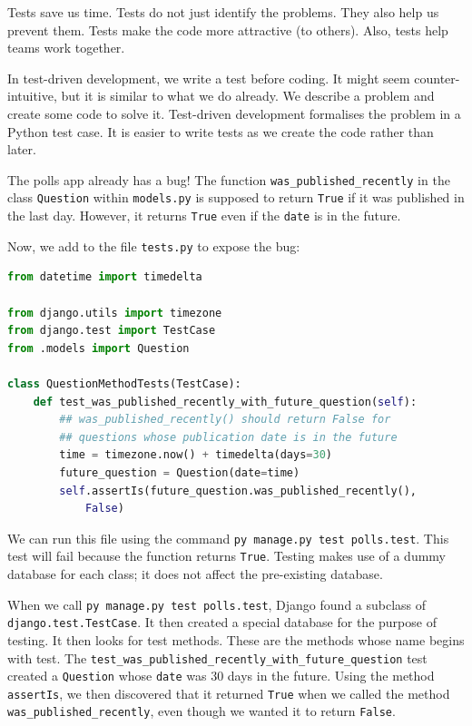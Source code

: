\documentclass[a4paper, openany]{memoir}
\begin{document}
    \noindent Tests save us time. Tests do not just identify the problems. They also help us prevent them. Tests make the code more attractive (to others). Also, tests help teams work together.

    \noindent In test-driven development, we write a test before coding. It might seem counter-intuitive, but it is similar to what we do already. We describe a problem and create some code to solve it. Test-driven development formalises the problem in a Python test case. It is easier to write tests as we create the code rather than later.

    \noindent The polls app already has a bug! The function \texttt{was\_published\_recently} in the class \texttt{Question} within \texttt{models.py} is supposed to return \texttt{True} if it was published in the last day. However, it returns \texttt{True} even if the \texttt{date} is in the future.

    \noindent Now, we add to the file \texttt{tests.py} to expose the bug:
\begin{lstlisting}[language=python]
from datetime import timedelta

from django.utils import timezone
from django.test import TestCase
from .models import Question

class QuestionMethodTests(TestCase):
    def test_was_published_recently_with_future_question(self):
        ## was_published_recently() should return False for
        ## questions whose publication date is in the future
        time = timezone.now() + timedelta(days=30)
        future_question = Question(date=time)
        self.assertIs(future_question.was_published_recently(), 
            False)
\end{lstlisting}
    We can run this file using the command \texttt{py manage.py test polls.test}. This test will fail because the function returns \texttt{True}. Testing makes use of a dummy database for each class; it does not affect the pre-existing database.

    \noindent When we call \texttt{py manage.py test polls.test}, Django found a subclass of \texttt{django.test.TestCase}. It then created a special database for the purpose of testing. It then looks for test methods. These are the methods whose name begins with test. The \texttt{test\_was\_published\_recently\_with\_future\_question} test created a \texttt{Question} whose \texttt{date} was 30 days in the future. Using the method \texttt{assertIs}, we then discovered that it returned \texttt{True} when we called the method \texttt{was\_published\_recently}, even though we wanted it to return \texttt{False}. 
\end{document}
